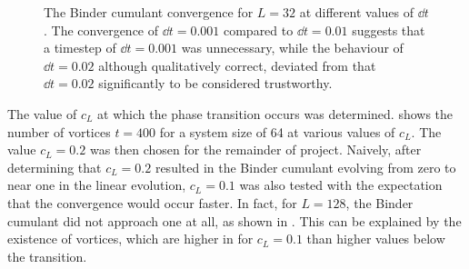 \begin{figure}[htbp!]
\centering
\caption{The Binder cumulant convergence for $L=32$ at different values of $\dd{t}$. The convergence of $\dd{t}=0.001$ compared to $\dd{t}=0.01$ suggests that a timestep of $\dd{t}=0.001$ was unnecessary, while the behaviour of $\dd{t}=0.02$ although qualitatively correct, deviated from that $\dd{t}=0.02$ significantly to be considered trustworthy.}
\label{fig:binder_different_cL}
\end{figure}

The value of $c_L$ at which the phase transition occurs was determined. \fig{\ref{fig:vor_vs_cL}} shows the number of vortices $t=400$ for a system size of 64 at various values of $c_L$. The value $c_L = 0.2$ was then chosen for the remainder of project. Naively, after determining that $c_L=0.2$ resulted in the Binder cumulant evolving from zero to near one in the linear evolution, $c_L=0.1$ was also tested with the expectation that the convergence would occur faster. In fact, for $L=128$, the Binder cumulant did not approach one at all, as shown in \fig{\ref{fig:binder_cL_0.1}}. This can be explained by the existence of vortices, which are higher in \fig{\ref{fig:vor_vs_cL}} for $c_L=0.1$ than higher values below the transition.    

